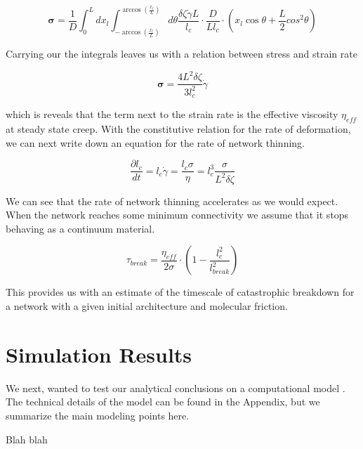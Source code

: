 \documentclass[prb,11pt]{revtex4-1}
\begin{document}
\begin{equation}
\mathbf{\sigma} =  \frac{1}{D} \int_0^L dx_l \int_{-\arccos (\frac{x_l}{L})}^{\arccos (\frac{x_l}{L})}d\theta \frac{\delta \zeta \dot \gamma L}{l_c} \cdot \frac{D}{Ll_c}\cdot (x_l \cos \theta + \frac{L}{2} cos^2\theta)
\end{equation}

Carrying our the integrals leaves us with a relation between stress and strain rate

\begin{equation}
\mathbf{\sigma} = \frac{4L^2\delta \zeta}{3l_c^2} \dot \gamma \end{equation}

which is reveals that the term next to the strain rate is the effective viscosity $\eta_{eff}$ at steady state creep.  With the constitutive relation for the rate of deformation, we can next write down an equation for the rate of network thinning.  

\begin{equation}
\frac{\partial l_c}{dt}=l_c\dot \gamma =\frac{l_c \sigma}{\eta}=l_c^3\frac{ \sigma}{L^2 \delta \zeta}
\end{equation}

We can see that the rate of network thinning accelerates as we would expect.  When the network reaches some minimum connectivity we assume that it stops behaving as a continuum material.  

\begin{equation}
\tau_{break} = \frac{\eta_{eff}}{2\sigma}\cdot\left ( 1 -\frac{l_c^2}{l_{break}^2} \right )
\end{equation}

This provides us with an estimate of the timescale of catastrophic breakdown for a network with a given initial architecture and molecular friction.

\section{Simulation Results}

We next, wanted to test our analytical conclusions on a computational model .  The technical details of the model can be found in the Appendix, but we summarize the main modeling points here.

Blah blah
\end{document}
